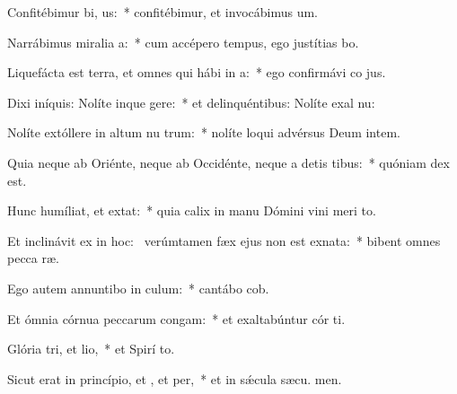 \item Confitébimur bi, us:~* confitébimur, et invocábimus  um.
\item Narrábimus miralia a:~* cum accépero tempus, ego justítias bo.
\item Liquefácta est terra, et omnes qui hábi in a:~* ego confirmávi co jus.
\item Dixi iníquis: Nolíte inque gere:~* et delinquéntibus: Nolíte exal nu:
\item Nolíte extóllere in altum nu trum:~* nolíte loqui advérsus Deum intem.
\item Quia neque ab Oriénte, neque ab Occidénte, neque a detis tibus:~* quóniam  dex est.
\item Hunc humíliat, et  extat:~* quia calix in manu Dómini vini meri  to.
\item Et inclinávit ex  in hoc:~\pscross{} verúmtamen fæx ejus non est exnata:~* bibent omnes pecca ræ.
\item Ego autem annuntibo in culum:~* cantábo  cob.
\item Et ómnia córnua peccarum congam:~* et exaltabúntur cór ti.
\item Glória tri, et lio,~* et Spirí to.
\item Sicut erat in princípio, et , et per,~* et in sǽcula sæcu. men.
